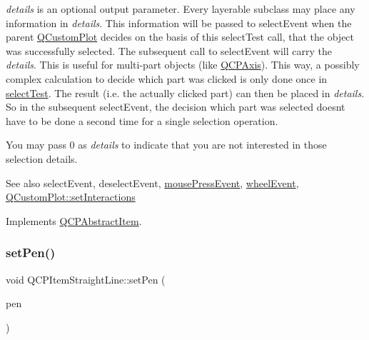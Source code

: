{\itshape details} is an optional output parameter. Every layerable subclass may place any information in {\itshape details}. This information will be passed to select\+Event when the parent \hyperlink{class_q_custom_plot}{Q\+Custom\+Plot} decides on the basis of this select\+Test call, that the object was successfully selected. The subsequent call to select\+Event will carry the {\itshape details}. This is useful for multi-\/part objects (like \hyperlink{class_q_c_p_axis}{Q\+C\+P\+Axis}). This way, a possibly complex calculation to decide which part was clicked is only done once in \hyperlink{class_q_c_p_item_straight_line_a2e36c9d4dcc3aeda78a5584f790e39e3}{select\+Test}. The result (i.\+e. the actually clicked part) can then be placed in {\itshape details}. So in the subsequent select\+Event, the decision which part was selected doesn\textquotesingle{}t have to be done a second time for a single selection operation.

You may pass 0 as {\itshape details} to indicate that you are not interested in those selection details.

\begin{DoxySeeAlso}{See also}
select\+Event, deselect\+Event, \hyperlink{class_q_c_p_layerable_af6567604818db90f4fd52822f8bc8376}{mouse\+Press\+Event}, \hyperlink{class_q_c_p_layerable_a47dfd7b8fd99c08ca54e09c362b6f022}{wheel\+Event}, \hyperlink{class_q_custom_plot_a5ee1e2f6ae27419deca53e75907c27e5}{Q\+Custom\+Plot\+::set\+Interactions} 
\end{DoxySeeAlso}


Implements \hyperlink{class_q_c_p_abstract_item_ae41d0349d68bb802c49104afd100ba2a}{Q\+C\+P\+Abstract\+Item}.

\mbox{\label{class_q_c_p_item_straight_line_a9f36c9c9e60d7d9ac084c80380ac8601}} 
\subsubsection{\texorpdfstring{set\+Pen()}{setPen()}}
{\footnotesize\ttfamily void Q\+C\+P\+Item\+Straight\+Line\+::set\+Pen (\begin{DoxyParamCaption}\item[{const Q\+Pen \&}]{pen }\end{DoxyParamCaption})}

